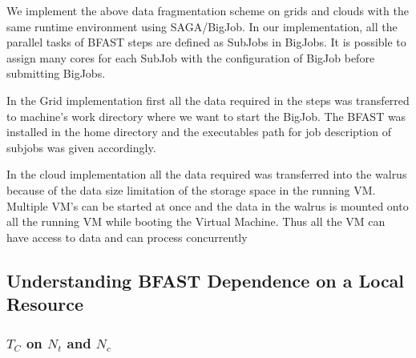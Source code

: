 \documentclass[12pt]{article}
\begin{document}
We implement the above data fragmentation scheme on grids and clouds with the same runtime environment using SAGA/BigJob\cite{saga-royalsoc,saga-ccgrid10, ecmls10}.  In our implementation, all the parallel tasks of BFAST steps are defined as SubJobs in BigJobs.  It is possible to assign many cores for each SubJob with the configuration of BigJob before submitting BigJobs. 
  
In the Grid implementation first all the data required in the steps was transferred to machine's  work 
directory where we want to start the BigJob. The BFAST was installed in the home directory and the
executables path for job description of subjobs was given accordingly.

In the cloud implementation all the data required was transferred into the walrus because of the data size limitation of the storage space in the
running VM. Multiple VM's can be started at once and the data in the walrus is mounted onto all the running VM
while booting the Virtual Machine. Thus all the VM can have access to data and can process concurrently


\subsection{Understanding BFAST Dependence on a Local Resource}

\subsubsection{$T_{C}$ on $N_t$ and $N_c$}
\end{document}
